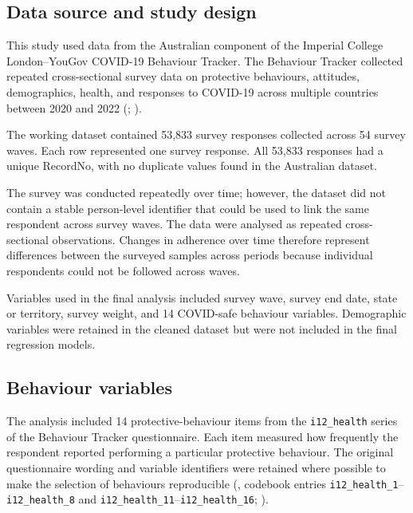 \documentclass[
  12pt,
  a4paper,
]{article}
\begin{document}
\subsection{Data source and study design}\label{data-source-and-study-design}

This study used data from the Australian component of the Imperial
College London--YouGov COVID-19 Behaviour Tracker. The Behaviour Tracker
collected repeated cross-sectional survey data on protective behaviours,
attitudes, demographics, health, and responses to COVID-19 across
multiple countries between 2020 and 2022 (; ).

The working dataset contained 53,833 survey responses collected across
54 survey waves. Each row represented one survey response. All 53,833
responses had a unique RecordNo, with no duplicate values found in the
Australian dataset.

The survey was conducted repeatedly over time; however, the dataset did
not contain a stable person-level identifier that could be used to link
the same respondent across survey waves. The data were analysed as
repeated cross-sectional observations. Changes in adherence over time
therefore represent differences between the surveyed samples across
periods because individual respondents could not be followed across
waves.

Variables used in the final analysis included survey wave, survey end
date, state or territory, survey weight, and 14 COVID-safe behaviour
variables. Demographic variables were retained in the cleaned dataset
but were not included in the final regression models.

\subsection{Behaviour variables}\label{behaviour-variables}

The analysis included 14 protective-behaviour items from the
\texttt{i12\_health} series of the Behaviour Tracker questionnaire. Each item
measured how frequently the respondent reported performing a particular
protective behaviour. The original questionnaire wording and variable
identifiers were retained where possible to make the selection of
behaviours reproducible (, codebook entries
\texttt{i12\_health\_1}--\texttt{i12\_health\_8} and \texttt{i12\_health\_11}--\texttt{i12\_health\_16}; ).
\end{document}

